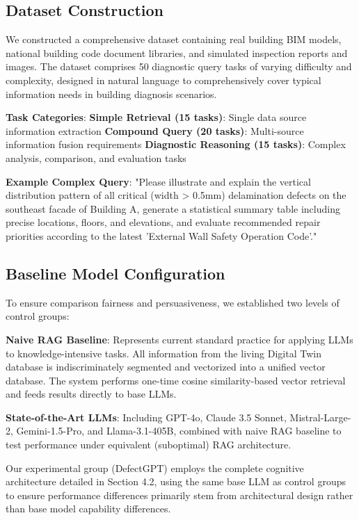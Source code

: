 \subsection{Dataset Construction}

We constructed a comprehensive dataset containing real building BIM models, national building code document libraries, and simulated inspection reports and images. The dataset comprises 50 diagnostic query tasks of varying difficulty and complexity, designed in natural language to comprehensively cover typical information needs in building diagnosis scenarios.

\textbf{Task Categories}:
\textbf{Simple Retrieval (15 tasks)}: Single data source information extraction
\textbf{Compound Query (20 tasks)}: Multi-source information fusion requirements  
\textbf{Diagnostic Reasoning (15 tasks)}: Complex analysis, comparison, and evaluation tasks

\textbf{Example Complex Query}: "Please illustrate and explain the vertical distribution pattern of all critical (width > 0.5mm) delamination defects on the southeast facade of Building A, generate a statistical summary table including precise locations, floors, and elevations, and evaluate recommended repair priorities according to the latest 'External Wall Safety Operation Code'."

\subsection{Baseline Model Configuration}

To ensure comparison fairness and persuasiveness, we established two levels of control groups:

\textbf{Naive RAG Baseline}: Represents current standard practice for applying LLMs to knowledge-intensive tasks. All information from the living Digital Twin database is indiscriminately segmented and vectorized into a unified vector database. The system performs one-time cosine similarity-based vector retrieval and feeds results directly to base LLMs.

\textbf{State-of-the-Art LLMs}: Including GPT-4o, Claude 3.5 Sonnet, Mistral-Large-2, Gemini-1.5-Pro, and Llama-3.1-405B, combined with naive RAG baseline to test performance under equivalent (suboptimal) RAG architecture.

Our experimental group (DefectGPT) employs the complete cognitive architecture detailed in Section 4.2, using the same base LLM as control groups to ensure performance differences primarily stem from architectural design rather than base model capability differences.

